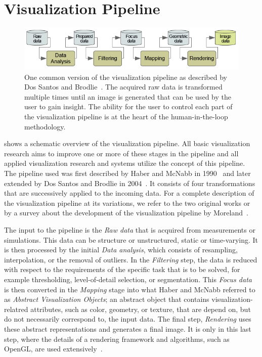 \section{Visualization Pipeline} \label{cha:intro:vp}
\begin{figure}
  \centering
  \includegraphics[width=\textwidth]{figures/intro/pipeline.png}
  \caption{One common version of the visualization pipeline as described by Dos Santos and Brodlie~\cite{dos2004gaining}.  The acquired raw data is transformed multiple times until an image is generated that can be used by the user to gain insight.  The ability for the user to control each part of the visualization pipeline is at the heart of the human-in-the-loop methodology.}
  \label{fig:intro:vp}
\end{figure}

 shows a schematic overview of the visualization pipeline.  All basic visualization research aims to improve one or more of these stages in the pipeline and all applied visualization research and systems utilize the concept of this pipeline.  The pipeline used was first described by Haber and McNabb in 1990~\cite{haber1990visualization} and later extended by Dos Santos and Brodlie in 2004~\cite{dos2004gaining}. It consists of four transformations that are successively applied to the incoming data.  For a complete description of the visualization pipeline at its variations, we refer to the two original works or by a survey about the development of the visualization pipeline by Moreland~\cite{moreland2013survey}.

The input to the pipeline is the \emph{Raw data} that is acquired from measurements or simulations.  This data can be structure or unstructured, static or time-varying.  It is then processed by the initial \emph{Data analysis}, which consists of resampling, interpolation, or the removal of outliers.  In the \emph{Filtering} step, the data is reduced with respect to the requirements of the specific task that is to be solved, for example thresholding, level-of-detail selection, or segmentation.  This \emph{Focus data} is then converted in the \emph{Mapping} stage into what Haber and McNabb referred to as \emph{Abstract Visualization Objects}; an abstract object that contains visualization-relatred attributes, such as color, geometry, or texture, that are depend on, but do not necessarily correspond to, the input data.  The final step, \emph{Rendering} uses these abstract representations and generates a final image.  It is only in this last step, where the details of a rendering framework and algorithms, such as OpenGL, are used extensively~\cite{segal2016opengl}.

